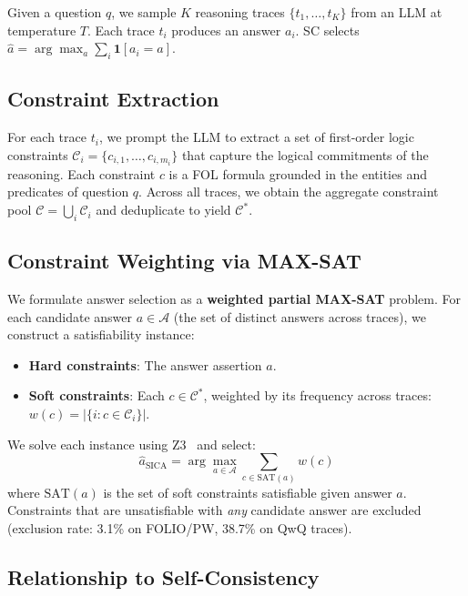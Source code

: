 \documentclass[11pt,a4paper]{article}
\begin{document}
Given a question $q$, we sample $K$ reasoning traces $\{t_1, \ldots, t_K\}$ from an LLM at temperature $T$.
Each trace $t_i$ produces an answer $a_i$.
SC selects $\hat{a} = \arg\max_a \sum_i \mathbf{1}[a_i = a]$.

\subsection{Constraint Extraction}

For each trace $t_i$, we prompt the LLM to extract a set of first-order logic constraints $\mathcal{C}_i = \{c_{i,1}, \ldots, c_{i,m_i}\}$ that capture the logical commitments of the reasoning.
Each constraint $c$ is a FOL formula grounded in the entities and predicates of question $q$.
Across all traces, we obtain the aggregate constraint pool $\mathcal{C} = \bigcup_i \mathcal{C}_i$ and deduplicate to yield $\mathcal{C}^*$.

\subsection{Constraint Weighting via MAX-SAT}

We formulate answer selection as a \textbf{weighted partial MAX-SAT} problem.
For each candidate answer $a \in \mathcal{A}$ (the set of distinct answers across traces), we construct a satisfiability instance:

\begin{itemize}
\item \textbf{Hard constraints}: The answer assertion $a$.
\item \textbf{Soft constraints}: Each $c \in \mathcal{C}^*$, weighted by its frequency across traces: $w(c) = |\{i : c \in \mathcal{C}_i\}|$.
\end{itemize}

We solve each instance using Z3~\citep{demoura2008z3} and select:
\begin{equation}
\hat{a}_{\text{SICA}} = \arg\max_{a \in \mathcal{A}} \sum_{c \in \text{SAT}(a)} w(c)
\end{equation}
where $\text{SAT}(a)$ is the set of soft constraints satisfiable given answer $a$.
Constraints that are unsatisfiable with \emph{any} candidate answer are excluded (exclusion rate: 3.1\% on FOLIO/PW, 38.7\% on QwQ traces).

\subsection{Relationship to Self-Consistency}
\end{document}
